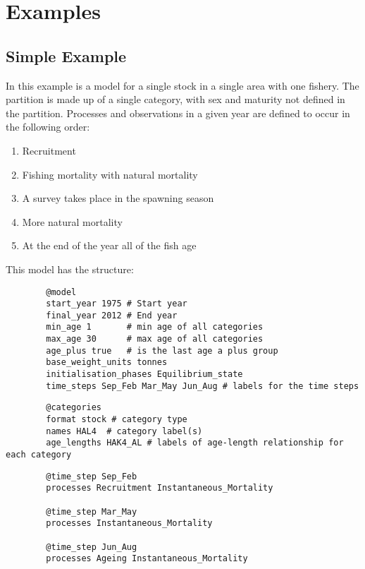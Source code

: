 \section{Examples}\label{Sec:examples}

\subsection{Simple Example}\label{Sec:simp}

In this example is a model for a single stock in a single area with one fishery. The partition is made up of a single category, with sex and maturity not defined in the partition. Processes and observations in a given year are defined to occur in the following order:

\begin{enumerate}
	\item Recruitment
	\item Fishing mortality with natural mortality
	\item A survey takes place in the spawning season
	\item More natural mortality
	\item At the end of the year all of the fish age
\end{enumerate}

This model has the structure:

{\small{\begin{verbatim}
		@model
		start_year 1975 # Start year
		final_year 2012 # End year
		min_age 1		# min age of all categories
		max_age 30		# max age of all categories
		age_plus true	# is the last age a plus group
		base_weight_units tonnes
		initialisation_phases Equilibrium_state
		time_steps Sep_Feb Mar_May Jun_Aug # labels for the time steps
		\end{verbatim}}}

{\small{\begin{verbatim}
		@categories
		format stock # category type
		names HAL4  # category label(s)
		age_lengths HAK4_AL # labels of age-length relationship for each category
		\end{verbatim}}}

{\small{\begin{verbatim}
		@time_step Sep_Feb 
		processes Recruitment Instantaneous_Mortality
		
		@time_step Mar_May 
		processes Instantaneous_Mortality 
		
		@time_step Jun_Aug 
		processes Ageing Instantaneous_Mortality
		\end{verbatim}}}

